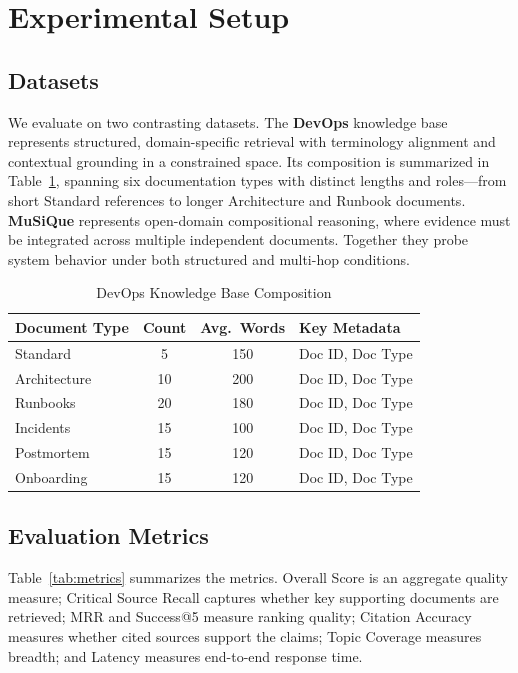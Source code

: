 \documentclass[conference]{IEEEtran}
\begin{document}
\section{Experimental Setup}
\subsection{Datasets}
We evaluate on two contrasting datasets. The \textbf{DevOps} knowledge base represents structured, domain-specific retrieval with terminology alignment and contextual grounding in a constrained space. Its composition is summarized in Table~\ref{tab:kb}, spanning six documentation types with distinct lengths and roles---from short Standard references to longer Architecture and Runbook documents. \textbf{MuSiQue} \cite{trivedi2022musique} represents open-domain compositional reasoning, where evidence must be integrated across multiple independent documents. Together they probe system behavior under both structured and multi-hop conditions.

\begin{table}[t]
\caption{DevOps Knowledge Base Composition}
\label{tab:kb}
\centering
\renewcommand{\arraystretch}{1.15}
\setlength{\tabcolsep}{5pt}
\begin{tabular}{@{}lccl@{}}
\toprule
\textbf{Document Type} & \textbf{Count} & \textbf{Avg.\ Words} & \textbf{Key Metadata} \\
\midrule
Standard     & 5  & 150 & Doc ID, Doc Type \\
Architecture & 10 & 200 & Doc ID, Doc Type \\
Runbooks     & 20 & 180 & Doc ID, Doc Type \\
Incidents    & 15 & 100 & Doc ID, Doc Type \\
Postmortem   & 15 & 120 & Doc ID, Doc Type \\
Onboarding   & 15 & 120 & Doc ID, Doc Type \\
\bottomrule
\end{tabular}
\end{table}

\subsection{Evaluation Metrics}
Table~\ref{tab:metrics} summarizes the metrics. Overall Score is an aggregate quality measure; Critical Source Recall captures whether key supporting documents are retrieved; MRR and Success@5 measure ranking quality; Citation Accuracy measures whether cited sources support the claims; Topic Coverage measures breadth; and Latency measures end-to-end response time.
\end{document}
